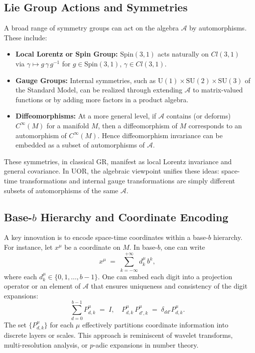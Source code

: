 \documentclass[11pt]{article}
\begin{document}
\subsection{Lie Group Actions and Symmetries}
A broad range of symmetry groups can act on the algebra $\mathcal{A}$ by automorphisms. These include:
\begin{itemize}
\item \textbf{Local Lorentz or Spin Group:} $\mathrm{Spin}(3,1)$ acts naturally on $Cl(3,1)$ via $\gamma \mapsto g\,\gamma\,g^{-1}$ for $g \in \mathrm{Spin}(3,1)$, $\gamma \in Cl(3,1)$.
\item \textbf{Gauge Groups:} Internal symmetries, such as $\mathrm{U}(1)\times \mathrm{SU}(2)\times \mathrm{SU}(3)$ of the Standard Model, can be realized through extending $\mathcal{A}$ to matrix-valued functions or by adding more factors in a product algebra.
\item \textbf{Diffeomorphisms:} At a more general level, if $\mathcal{A}$ contains (or deforms) $C^\infty(M)$ for a manifold $M$, then a diffeomorphism of $M$ corresponds to an automorphism of $C^\infty(M)$. Hence diffeomorphism invariance can be embedded as a subset of automorphisms of $\mathcal{A}$.
\end{itemize}
These symmetries, in classical GR, manifest as local Lorentz invariance and general covariance. In UOR, the algebraic viewpoint unifies these ideas: space-time transformations and internal gauge transformations are simply different subsets of automorphisms of the same $\mathcal{A}$.

\subsection{Base-\texorpdfstring{$b$}{} Hierarchy and Coordinate Encoding}
A key innovation is to encode space-time coordinates within a base-$b$ hierarchy. For instance, let $x^\mu$ be a coordinate on $M$. In base-$b$, one can write
\[
x^\mu \;=\; \sum_{k=-\infty}^{+\infty} d_k^\mu \, b^k,
\]
where each $d_k^\mu \in \{0,1,\dots,b-1\}$. One can embed each digit into a projection operator or an element of $\mathcal{A}$ that ensures uniqueness and consistency of the digit expansions:
\[
\sum_{d=0}^{b-1} P_{d,k}^\mu \;=\; I, 
\quad
P_{d,k}^\mu \, P_{d',k}^\mu \;=\; \delta_{dd'} P_{d,k}^\mu.
\]
The set $\{P_{d,k}^\mu\}$ for each $\mu$ effectively partitions coordinate information into discrete layers or scales. This approach is reminiscent of wavelet transforms, multi-resolution analysis, or $p$-adic expansions in number theory. 
\end{document}
